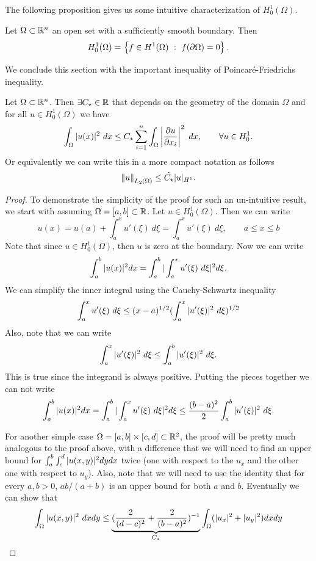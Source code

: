 The following proposition gives us some intuitive characterization of $ H^1_0(\Omega) $.

\begin{proposition}
	Let $ \Omega \subset\mathbb{R}^n $ an open set with a sufficiently smooth boundary. Then 
	\[ H_0^1(\Omega) = \Set{f \in H^1(\Omega)\ :\ f(\partial \Omega) = 0}.   \]
\end{proposition}

We conclude this section with the important inequality of Poincar\'{e}-Friedrichs inequality.

\begin{theorem}
	Let $ \Omega \subset \mathbb{R}^n $. Then $ \exists C_{\star} \in \mathbb{R} $ that depends on the geometry of the domain $ \Omega $ and for all $ u \in H_0^1(\Omega) $ we have
	\[ \int_\Omega |u(x)|^2\ dx \leq  C_{\star} \sum_{i=1}^{n} \int_\Omega \left| \frac{\partial u}{\partial x_i} \right|^2\ dx, \qquad \forall u \in H_0^1. \]
	Or equivalently we can write this in a more compact notation as follows
	\[ \norm{u}_{L_2(\Omega)} \leq \tilde{C_{\star}} |u|_{H^1}. \]
\end{theorem}
\begin{proof}
	To demonstrate the simplicity of the proof for such an un-intuitive result, we start with assuming $ \Omega = [a,b] \subset \mathbb{R} $. Let $ u \in H^1_0(\Omega) $. Then we can write
	\[ u(x) = u(a) + \int_{a}^{x}u'(\xi)\ d\xi = \int_{a}^{x}u'(\xi)\ d\xi, \qquad a\leq x\leq b \]
	Note that since $ u \in H_0^1(\Omega) $, then $ u $ is zero at the boundary. Now we can write
	\[ \int_{a}^{b} |u(x)|^2 dx = \int_{a}^{b}|\int_{a}^{x}u'(\xi)\ d\xi|^2 d\xi. \]
	We can simplify the inner integral using the Cauchy-Schwartz inequality
	\[ \int_{a}^{x} u'(\xi)\ d\xi \leq (x-a)^{1/2}(\int_{a}^{x}|u'(\xi)|^2\ d\xi)^{1/2} \]
	Also, note that we can write
	\[ \int_{a}^{x} |u'(\xi)|^2\ d\xi \leq \int_{a}^{b}|u'(\xi)|^2\ d\xi.  \]
	This is true since the integrand is always positive. Putting the pieces together we can not write
	\[ \int_{a}^{b} |u(x)|^2 dx = \int_{a}^{b}|\int_{a}^{x}u'(\xi)\ d\xi|^2 d\xi \leq \frac{(b-a)^2}{2} \int_{a}^{b}|u'(\xi)|^2\ d\xi. \]
	
	For another simple case $ \Omega = [a,b]\times [c,d] \subset \mathbb{R}^2 $, the proof will be pretty much analogous to the proof above, with a difference that we will need to find an upper bound for $\int_{a}^{b}\int_{c}^{d}|u(x,y)|^2dydx$ twice (one with respect to the $ u_x $ and the other one with respect to $ u_y $). Also, note that we will need to use the identity that for every $ a,b >0 $, $ ab/(a+b) $ is an upper bound for both $ a $ and $ b $. Eventually we can show that 
	\[ \int_{\Omega} |u(x,y)|^2\ dxdy \leq \underbrace{(\frac{2}{(d-c)^2} + \frac{2}{(b-a)^2})^{-1}}_{C_\star}\int_\Omega (|u_x|^2 + |u_y|^2) dxdy \]
\end{proof}

